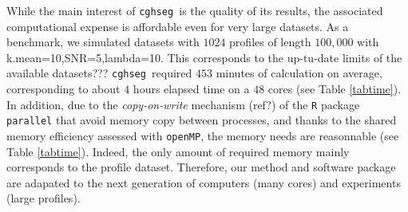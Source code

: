 \documentclass{llncs}
\newcommand{\esoft}{\texttt{cghseg }}
\begin{document}
While the main interest of \esoft is the quality of its results, the associated computational expense is affordable even
for very large datasets. As a benchmark, we simulated datasets with $1024$ profiles of length $100,000$ with k.mean=10,SNR=5,lambda=10. This corresponds to the up-tu-date limits of the available datasets??? 
\esoft required $453$ minutes of calculation on average, corresponding to about $4$ hours elapsed time on a $48$ cores (see Table \ref{tabtime}).
In addition, due to the {\it copy-on-write} mechanism (ref?) of the \texttt{R} package \texttt{parallel} that avoid memory copy between processes, and thanks to the shared memory efficiency assessed with \texttt{openMP}, the memory needs are reasonnable (see Table \ref{tabtime}). Indeed, the only amount of required memory mainly corresponds to the profile dataset.
Therefore, our method and software package are adapated to the next generation of computers (many cores) and experiments (large profiles).
\end{document}
